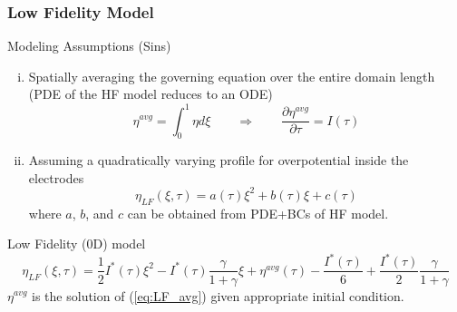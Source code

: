 \documentclass[10pt,xcolor=dvipsnames,compress]{beamer}
\begin{document}
\begin{frame}
\frametitle{Low Fidelity Model}
\vfill


\begin{alertblock}{Modeling Assumptions (Sins)}
\begin{enumerate}[i.]

\item Spatially
averaging the governing equation over the entire domain length (PDE of the HF model reduces to an ODE) 
%
\begin{equation*}\label{eq:LF_avg}
\eta^{avg} = \int_0^1 \eta d\xi \qquad \Rightarrow \qquad
\frac{\partial{\eta}^{avg}}{\partial\tau} = I(\tau)
\end{equation*}

\item Assuming a quadratically varying profile for overpotential inside the electrodes
\begin{equation*}\label{eq:quadratic}
\eta_{LF} (\xi,\tau)= a(\tau)\xi^2 + b(\tau)\xi + c(\tau)
\end{equation*}
where $a$, $b$, and $c$ can be obtained from PDE+BCs of HF model.

\end{enumerate}
\end{alertblock}

\begin{block}{Low Fidelity (0D) model}
\begin{equation*}\label{eq:LF}
\eta_{LF}(\xi,\tau) = 
\frac{1}{2}I^*(\tau)\xi^2 - I^*(\tau) \frac{\gamma}{1+\gamma}\xi + {\eta}^{avg}(\tau) - \frac{I^*(\tau)}{6} + \frac{I^*(\tau)}{2}\frac{\gamma}{1+\gamma}
\end{equation*}
${\eta}^{avg}$ is the solution of (\ref{eq:LF_avg}) given appropriate initial condition.
\end{block}


\vfill
\end{frame}
\end{document}
